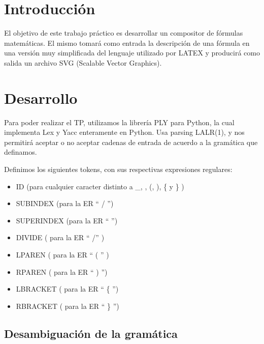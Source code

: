 \documentclass[a4paper, 10pt, twoside]{article}
\begin{document}
\newpage

\tableofcontents

\newpage


\section{Introducción}
El objetivo de este trabajo práctico es desarrollar un compositor de fórmulas matemáticas. El mismo tomará como entrada la descripción de una fórmula en una versión muy simplificada del lenguaje utilizado por LATEX y producirá como salida un archivo SVG (Scalable Vector Graphics).

\section{Desarrollo}
Para poder realizar el TP, utilizamos la librería PLY para Python, la cual implementa Lex y Yacc enteramente en Python. Usa parsing LALR(1), y nos permitirá aceptar o no aceptar cadenas de entrada de acuerdo a la gramática que definamos.

Definimos los siguientes tokens, con sus respectivas expresiones regulares: 
\begin{itemize}
  \item ID (para cualquier caracter distinto a \_, \detokenize{^}, (, ), \{ y \} )
  \item SUBINDEX (para la ER `` / '')
  \item SUPERINDEX (para la ER `` \detokenize{^} '')
  \item DIVIDE ( para la ER `` /'' )
  \item LPAREN ( para la ER `` ( '' )
  \item RPAREN ( para la ER `` ) '')
  \item LBRACKET ( para la ER `` \{ '')
  \item RBRACKET ( para la ER `` \} '')
\end{itemize}

\subsection{Desambiguación de la gramática}
\end{document}
